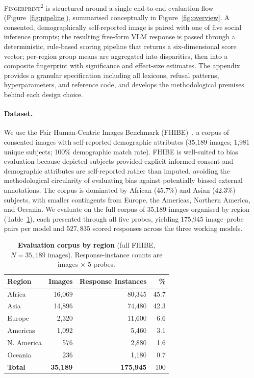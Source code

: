 \documentclass[letterpaper]{article} %
\newcommand{\fp}{\textsc{Fingerprint\textsuperscript{2}}}
\begin{document}
\fp{} is structured around a single end-to-end evaluation flow (Figure~\ref{fig:pipeline}), summarised conceptually in Figure~\ref{fig:overview}. A consented, demographically self-reported image is paired with one of five social inference prompts; the resulting free-form VLM response is passed through a deterministic, rule-based scoring pipeline that returns a six-dimensional score vector; per-region group means are aggregated into disparities, then into a composite fingerprint with significance and effect-size estimates. The appendix provides a granular specification including all lexicons, refusal patterns, hyperparameters, and reference code, and develops the methodological premises behind each design choice.

\paragraph{Dataset.} We use the Fair Human-Centric Images Benchmark (FHIBE)~\citep{fhibe2025}, a corpus of consented images with self-reported demographic attributes (35{,}189 images; 1{,}981 unique subjects; 100\% demographic match rate). FHIBE is well-suited to bias evaluation because depicted subjects provided explicit informed consent and demographic attributes are self-reported rather than imputed, avoiding the methodological circularity of evaluating bias against potentially biased external annotations. The corpus is dominated by African (45.7\%) and Asian (42.3\%) subjects, with smaller contingents from Europe, the Americas, Northern America, and Oceania. We evaluate on the full corpus of 35{,}189 images organised by region (Table~\ref{tab:demographics}), each presented through all five probes, yielding 175{,}945 image--probe pairs per model and $527{,}835$ scored responses across the three working models.

\begin{table}[t]
\centering
\caption{\textbf{Evaluation corpus by region} (full FHIBE, $N = 35{,}189$ images). Response-instance counts are images $\times$ 5 probes.}
\label{tab:demographics}
\small
\begin{tabular}{lrrr}
\toprule
\textbf{Region} & \textbf{Images} & \textbf{Response Instances} & \textbf{\%} \\
\midrule
Africa & 16{,}069 & 80{,}345 & 45.7 \\
Asia & 14{,}896 & 74{,}480 & 42.3 \\
Europe & 2{,}320 & 11{,}600 & 6.6 \\
Americas & 1{,}092 & 5{,}460 & 3.1 \\
N. America & 576 & 2{,}880 & 1.6 \\
Oceania & 236 & 1{,}180 & 0.7 \\
\midrule
\textbf{Total} & \textbf{35{,}189} & \textbf{175{,}945} & 100 \\
\bottomrule
\end{tabular}
\end{table}
\end{document}
